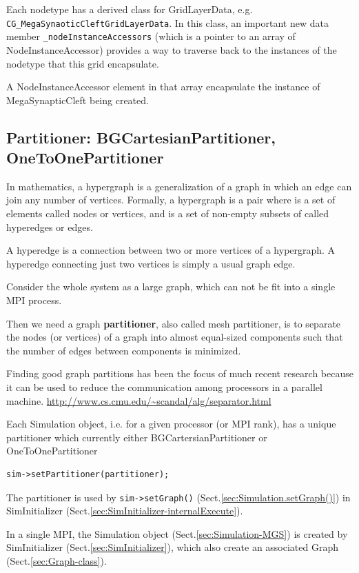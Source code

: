 Each nodetype has a derived class for GridLayerData, e.g.
\verb!CG_MegaSynaoticCleftGridLayerData!. In this class, an important new data
member \verb!_nodeInstanceAccessors! (which is a pointer to an array of
NodeInstanceAccessor) provides a way to traverse back to the instances of the
nodetype that this grid encapsulate.

A NodeInstanceAccessor element in that array encapsulate the instance of
MegaSynapticCleft being created.


\subsection{Partitioner: BGCartesianPartitioner, OneToOnePartitioner}
\label{sec:Partitioner}

In mathematics, a hypergraph is a generalization of a graph in which an edge can
join any number of vertices. Formally, a hypergraph is a pair where is a set of
elements called nodes or vertices, and is a set of non-empty subsets of called
hyperedges or edges.


A hyperedge is a connection between two or more vertices of a hypergraph. A
hyperedge connecting just two vertices is simply a usual graph edge.


Consider the whole system as a large graph, which can not be fit into a single
MPI process.

Then we need a graph {\bf partitioner},  also called mesh partitioner, is to
separate the nodes (or vertices) of a graph into almost equal-sized components
such that the number of edges between components is minimized.

Finding good graph partitions has been the focus of much recent research because
it can be used to reduce the communication among processors in a parallel
machine. \url{http://www.cs.cmu.edu/~scandal/alg/separator.html}




Each Simulation object, i.e. for a given processor (or MPI rank), has a unique
partitioner which currently either BGCartersianPartitioner or
OneToOnePartitioner
\begin{verbatim}
sim->setPartitioner(partitioner);
\end{verbatim}
The partitioner is used by \verb!sim->setGraph()!
(Sect.\ref{sec:Simulation.setGraph()}) in SimInitializer
(Sect.\ref{sec:SimInitializer-internalExecute}).

In a single MPI, the Simulation object (Sect.\ref{sec:Simulation-MGS}) is
created by SimInitializer (Sect.\ref{sec:SimInitializer}), which also create an
associated Graph (Sect.\ref{sec:Graph-class}).

